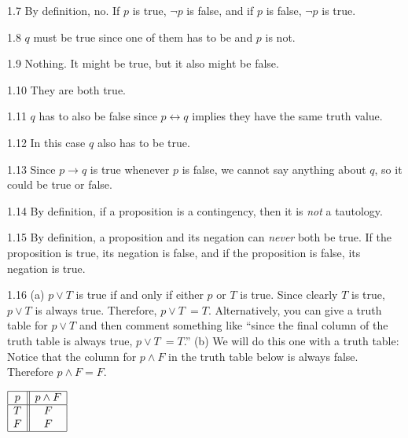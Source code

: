 \begin{RequAnswer}{1.7}
By definition, no. If $p$ is true, $\neg p$ is false, and if $p$ is false, $\neg p$ is true.
\end{RequAnswer}
\begin{RequAnswer}{1.8}
$q$ must be true since one of them has to be and $p$ is not.
\end{RequAnswer}
\begin{RequAnswer}{1.9}
Nothing. It might be true, but it also might be false.
\end{RequAnswer}
\begin{RequAnswer}{1.10}
They are both true.
\end{RequAnswer}
\begin{RequAnswer}{1.11}
$q$ has to also be false since $p\leftrightarrow q$ implies they have the same truth value.
\end{RequAnswer}
\begin{RequAnswer}{1.12}
In this case $q$ also has to be true.
\end{RequAnswer}
\begin{RequAnswer}{1.13}
Since $p\rightarrow q$ is true whenever $p$ is false, we cannot say anything about $q$,
so it could be true or false.
\end{RequAnswer}
\begin{RequAnswer}{1.14}
By definition, if a proposition is a contingency, then it is {\em not}
a tautology.
\end{RequAnswer}
\begin{RequAnswer}{1.15}
By definition, a proposition and its negation can {\em never} both be true.
If the proposition is true, its negation is false, and if the proposition is false, its negation is true.
\end{RequAnswer}
\begin{RequAnswer}{1.16}
(a) $p\vee T$ is true if and only if either $p$ or $T$ is true. Since clearly $T$ is true, $p\vee T$ is always true.
Therefore, $ p\vee T \ = T$.
Alternatively, you can give a truth table for $p\vee T$ and then comment something like
``since the final column of the truth table is always true, $ p\vee T \ = T$.''
(b) We will do this one with a truth table:
Notice that the column for $p\wedge F$ in the truth table below is always false. Therefore  $p\wedge F = F$.

$\begin{array}{|c||c|} \hline p & p\wedge F \\
\hline
T & F\\
F & F\\
\hline
\end{array}$
\end{RequAnswer}
